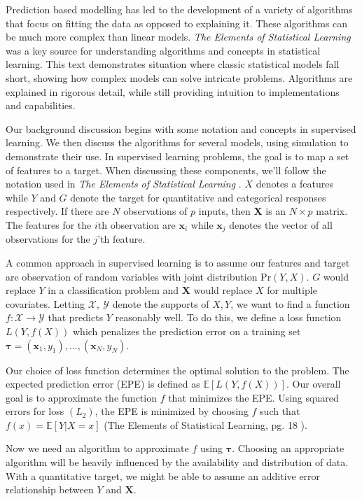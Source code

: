 \documentclass[
  12pt,
  letterpaper,
  DIV=11,
  numbers=noendperiod]{scrartcl}
\newcommand{\bm}{\mathbf}
\begin{document}
Prediction based modelling has led to the development of a variety of
algorithms that focus on fitting the data as opposed to explaining it.
These algorithms can be much more complex than linear models. \emph{The
Elements of Statistical Learning} \cite{esl} was a key source for
understanding algorithms and concepts in statistical learning. This text
demonstrates situation where classic statistical models fall short,
showing how complex models can solve intricate problems. Algorithms are
explained in rigorous detail, while still providing intuition to
implementations and capabilities.

Our background discussion begins with some notation and concepts in
supervised learning. We then discuss the algorithms for several models,
using simulation to demonstrate their use. In supervised learning
problems, the goal is to map a set of features to a target. When
discussing these components, we'll follow the notation used in \emph{The
Elements of Statistical Learning} \cite{esl}. \(X\) denotes a features
while \(Y\) and \(G\) denote the target for quantitative and categorical
responses respectively. If there are \(N\) observations of \(p\) inputs,
then \(\bm X\) is an \(N\times p\) matrix. The features for the \(i\)th
observation are \(\bm x_i\) while \(\bm x_j\) denotes the vector of all
observations for the \(j\)'th feature.

A common approach in supervised learning is to assume our features and
target are observation of random variables with joint distribution
\(\text{Pr}(Y,X)\). \(G\) would replace \(Y\) in a classification
problem and \(\bm X\) would replace \(X\) for multiple covariates.
Letting \(\mathcal{X,\ Y}\) denote the supports of \(X, Y\), we want to
find a function \(f:\mathcal{X}\rightarrow\mathcal{Y}\) that predicts
\(Y\) reasonably well. To do this, we define a loss function
\(L(Y,f(X))\) which penalizes the prediction error on a training set
\(\boldsymbol \tau=(\bm x_1,y_1),...,(\bm x_N,y_N)\).

Our choice of loss function determines the optimal solution to the
problem. The expected prediction error (EPE) is defined as
\(\mathbb{E}[L(Y,f(X))]\). Our overall goal is to approximate the
function \(f\) that minimizes the EPE. Using squared errors for loss
\((L_2)\), the EPE is minimized by choosing \(f\) such that
\(f(x)=\mathbb{E}[Y|X=x]\) (The Elements of Statistical Learning, pg. 18
\cite{esl}).

Now we need an algorithm to approximate \(f\) using
\(\boldsymbol \tau\). Choosing an appropriate algorithm will be heavily
influenced by the availability and distribution of data. With a
quantitative target, we might be able to assume an additive error
relationship between \(Y\) and \(\bm X\).
\end{document}
